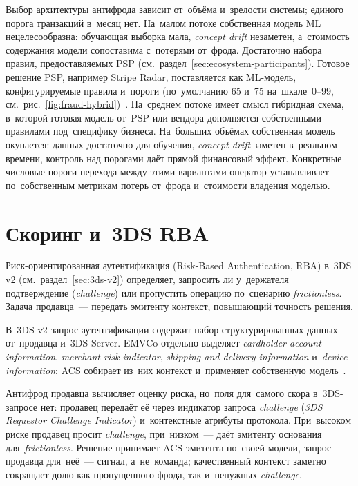 Выбор архитектуры антифрода зависит от~объёма и~зрелости системы; единого
порога транзакций в~месяц нет. На~малом потоке собственная модель ML
нецелесообразна: обучающая выборка мала, \textit{concept drift} незаметен,
а~стоимость содержания модели сопоставима с~потерями от~фрода. Достаточно
набора правил, предоставляемых PSP
(см.~раздел~\ref{sec:ecosystem-participants}). Готовое решение PSP, например
Stripe Radar, поставляется как ML-модель, конфигурируемые правила
и~пороги (по~умолчанию 65 и~75 на~шкале~0--99,
см.~рис.~\ref{fig:fraud-hybrid})~\cite{stripe-radar-risk-evaluation}. На~среднем
потоке имеет смысл гибридная схема, в~которой готовая модель от~PSP или вендора
дополняется собственными правилами под~специфику бизнеса. На~больших объёмах
собственная модель окупается: данных достаточно для обучения, \textit{concept
drift} заметен в~реальном времени, контроль над порогами даёт прямой финансовый
эффект. Конкретные числовые пороги перехода между этими вариантами оператор
устанавливает по~собственным метрикам потерь от~фрода и~стоимости владения
моделью.

\section{Скоринг и~3DS RBA}\label{sec:fraud-3ds-rba}

Риск-ориентированная аутентификация (Risk-Based Authentication, RBA) в~3DS v2
(см.~раздел~\ref{sec:3ds-v2}) определяет, запросить ли у~держателя
подтверждение (\textit{challenge}) или пропустить операцию по~сценарию
\textit{frictionless}. Задача продавца~--- передать
эмитенту контекст, повышающий точность решения.

В~3DS v2 запрос аутентификации содержит набор структурированных данных
от~продавца и~3DS Server. EMVCo отдельно выделяет
\textit{cardholder account information},
\textit{merchant risk indicator}, \textit{shipping and delivery information}
и~\textit{device information}; ACS собирает из~них контекст и~применяет
собственную модель~\cite{emvco-3ds,emvco-3ds-tech-features}.

Антифрод продавца вычисляет оценку риска, но~поля для~самого скора
в~3DS-запросе нет: продавец передаёт её через индикатор запроса
\textit{challenge} (\textit{3DS Requestor Challenge Indicator}) и~контекстные
атрибуты протокола. При~высоком риске продавец просит \textit{challenge},
при~низком~--- даёт эмитенту основания для~\textit{frictionless}. Решение
принимает ACS эмитента по~своей модели, запрос продавца для~неё~--- сигнал,
а~не~команда; качественный контекст заметно сокращает долю как пропущенного фрода, так
и~ненужных \textit{challenge}.

